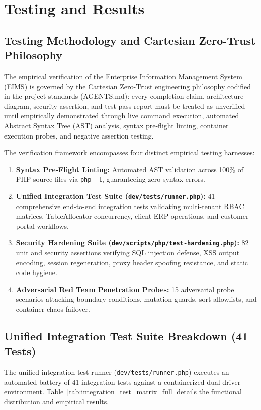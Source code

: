 \chapter{Testing and Results}
\label{chap:testing_results}

\section{Testing Methodology and Cartesian Zero-Trust Philosophy}
\label{sec:test_methodology}
The empirical verification of the Enterprise Information Management System (EIMS) is governed by the Cartesian Zero-Trust engineering philosophy codified in the project standards (\textsf{AGENTS.md}): every completion claim, architecture diagram, security assertion, and test pass report must be treated as unverified until empirically demonstrated through live command execution, automated Abstract Syntax Tree (AST) analysis, syntax pre-flight linting, container execution probes, and negative assertion testing.

The verification framework encompasses four distinct empirical testing harnesses:
\begin{enumerate}
    \item \textbf{Syntax Pre-Flight Linting:} Automated AST validation across 100\% of PHP source files via \texttt{php -l}, guaranteeing zero syntax errors.
    \item \textbf{Unified Integration Test Suite (\texttt{dev/tests/runner.php}):} 41 comprehensive end-to-end integration tests validating multi-tenant RBAC matrices, TableAllocator concurrency, client ERP operations, and customer portal workflows.
    \item \textbf{Security Hardening Suite (\texttt{dev/scripts/php/test-hardening.php}):} 82 unit and security assertions verifying SQL injection defense, XSS output encoding, session regeneration, proxy header spoofing resistance, and static code hygiene.
    \item \textbf{Adversarial Red Team Penetration Probes:} 15 adversarial probe scenarios attacking boundary conditions, mutation guards, sort allowlists, and container chaos failover.
\end{enumerate}

\section{Unified Integration Test Suite Breakdown (41 Tests)}
\label{sec:test_integration}
The unified integration test runner (\texttt{dev/tests/runner.php}) executes an automated battery of 41 integration tests against a containerized dual-driver environment. Table~\ref{tab:integration_test_matrix_full} details the functional distribution and empirical results.

